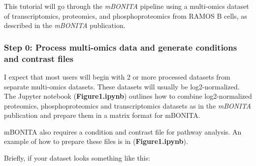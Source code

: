 \documentclass[]{article}
\begin{document}
This tutorial will go through the \emph{mBONITA} pipeline using a
multi-omics dataset of transcriptomics, proteomics, and
phosphoproteomics from RAMOS B cells, as described in the \emph{mBONITA}
publication.

\hypertarget{step-0-process-multi-omics-data-and-generate-conditions-and-contrast-files}{%
\subsubsection{Step 0: Process multi-omics data and generate conditions
and contrast
files}\label{step-0-process-multi-omics-data-and-generate-conditions-and-contrast-files}}

I expect that most users will begin with 2 or more processed datasets
from separate multi-omics datasets. These datasets will usually be
log2-normalized. The Jupyter notebook (\textbf{Figure1.ipynb}) outlines
how to combine log2-normalized proteomics, phosphoproteomics and
transcriptomics datasets as in the \emph{mBONITA} publication and
prepare them in a matrix format for mBONITA.

mBONITA also requires a condition and contrast file for pathway
analysis. An example of how to prepare these files is in
(\textbf{Figure1.ipynb}).

Briefly, if your dataset looks something like this:
\end{document}
